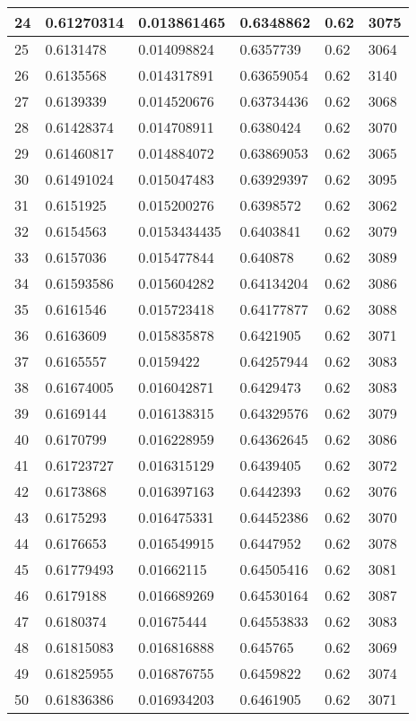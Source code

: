 \begin{longtable}{|l|l|l|l|l|l|}
24 & 0.61270314 & 0.013861465 & 0.6348862 & 0.62 & 3075 \\ \hline 
25 & 0.6131478 & 0.014098824 & 0.6357739 & 0.62 & 3064 \\ \hline 
26 & 0.6135568 & 0.014317891 & 0.63659054 & 0.62 & 3140 \\ \hline 
27 & 0.6139339 & 0.014520676 & 0.63734436 & 0.62 & 3068 \\ \hline 
28 & 0.61428374 & 0.014708911 & 0.6380424 & 0.62 & 3070 \\ \hline 
29 & 0.61460817 & 0.014884072 & 0.63869053 & 0.62 & 3065 \\ \hline 
30 & 0.61491024 & 0.015047483 & 0.63929397 & 0.62 & 3095 \\ \hline 
31 & 0.6151925 & 0.015200276 & 0.6398572 & 0.62 & 3062 \\ \hline 
32 & 0.6154563 & 0.0153434435 & 0.6403841 & 0.62 & 3079 \\ \hline 
33 & 0.6157036 & 0.015477844 & 0.640878 & 0.62 & 3089 \\ \hline 
34 & 0.61593586 & 0.015604282 & 0.64134204 & 0.62 & 3086 \\ \hline 
35 & 0.6161546 & 0.015723418 & 0.64177877 & 0.62 & 3088 \\ \hline 
36 & 0.6163609 & 0.015835878 & 0.6421905 & 0.62 & 3071 \\ \hline 
37 & 0.6165557 & 0.0159422 & 0.64257944 & 0.62 & 3083 \\ \hline 
38 & 0.61674005 & 0.016042871 & 0.6429473 & 0.62 & 3083 \\ \hline 
39 & 0.6169144 & 0.016138315 & 0.64329576 & 0.62 & 3079 \\ \hline 
40 & 0.6170799 & 0.016228959 & 0.64362645 & 0.62 & 3086 \\ \hline 
41 & 0.61723727 & 0.016315129 & 0.6439405 & 0.62 & 3072 \\ \hline 
42 & 0.6173868 & 0.016397163 & 0.6442393 & 0.62 & 3076 \\ \hline 
43 & 0.6175293 & 0.016475331 & 0.64452386 & 0.62 & 3070 \\ \hline 
44 & 0.6176653 & 0.016549915 & 0.6447952 & 0.62 & 3078 \\ \hline 
45 & 0.61779493 & 0.01662115 & 0.64505416 & 0.62 & 3081 \\ \hline 
46 & 0.6179188 & 0.016689269 & 0.64530164 & 0.62 & 3087 \\ \hline 
47 & 0.6180374 & 0.01675444 & 0.64553833 & 0.62 & 3083 \\ \hline 
48 & 0.61815083 & 0.016816888 & 0.645765 & 0.62 & 3069 \\ \hline 
49 & 0.61825955 & 0.016876755 & 0.6459822 & 0.62 & 3074 \\ \hline 
50 & 0.61836386 & 0.016934203 & 0.6461905 & 0.62 & 3071 \\ \hline 
\end{longtable}